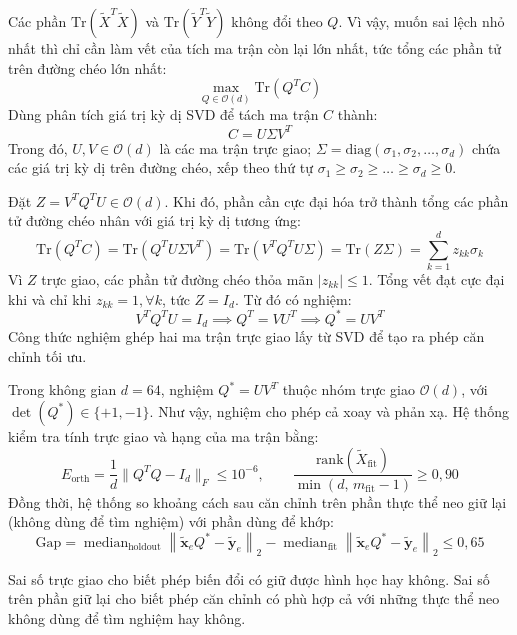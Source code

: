 Các phần $\text{Tr}(\widetilde{X}^T \widetilde{X})$ và $\text{Tr}(\widetilde{Y}^T \widetilde{Y})$ không đổi theo $Q$. Vì vậy, muốn sai lệch nhỏ nhất thì chỉ cần làm vết của tích ma trận còn lại lớn nhất, tức tổng các phần tử trên đường chéo lớn nhất:
\begin{equation}
\max_{Q \in \mathcal{O}(d)} \text{Tr}\left( Q^T C \right)
\end{equation}
Dùng phân tích giá trị kỳ dị SVD để tách ma trận $C$ thành:
\begin{equation}
C = U \Sigma V^T
\end{equation}
Trong đó, $U, V \in \mathcal{O}(d)$ là các ma trận trực giao; $\Sigma = \text{diag}(\sigma_1, \sigma_2, \dots, \sigma_d)$ chứa các giá trị kỳ dị trên đường chéo, xếp theo thứ tự $\sigma_1 \ge \sigma_2 \ge \dots \ge \sigma_d \ge 0$.

Đặt $Z = V^T Q^T U \in \mathcal{O}(d)$. Khi đó, phần cần cực đại hóa trở thành tổng các phần tử đường chéo nhân với giá trị kỳ dị tương ứng:
\begin{equation}
\text{Tr}\left( Q^T C \right) = \text{Tr}\left( Q^T U \Sigma V^T \right) = \text{Tr}\left( V^T Q^T U \Sigma \right) = \text{Tr}\left( Z \Sigma \right) = \sum_{k=1}^d z_{kk} \sigma_k
\end{equation}
Vì $Z$ trực giao, các phần tử đường chéo thỏa mãn $|z_{kk}| \le 1$. Tổng vết đạt cực đại khi và chỉ khi $z_{kk} = 1, \forall k$, tức $Z = I_d$. Từ đó có nghiệm:
\begin{equation}
V^T Q^T U = I_d \implies Q^T = V U^T \implies Q^* = U V^T
\label{eq:procrustes_solution}
\end{equation}
Công thức nghiệm ghép hai ma trận trực giao lấy từ SVD để tạo ra phép căn chỉnh tối ưu.
\begin{remark}
Trong không gian $d = 64$, nghiệm $Q^* = U V^T$ thuộc nhóm trực giao $\mathcal{O}(d)$, với $\det(Q^*) \in \{+1, -1\}$. Như vậy, nghiệm cho phép cả xoay và phản xạ. Hệ thống kiểm tra tính trực giao và hạng của ma trận bằng:
\begin{equation}
E_{\text{orth}} = \frac{1}{d} \| Q^T Q - I_d \|_F \le 10^{-6}, \qquad \frac{\text{rank}(\widetilde{X}_{\text{fit}})}{\min(d,\, m_{\text{fit}} - 1)} \ge 0{,}90
\end{equation}
Đồng thời, hệ thống so khoảng cách sau căn chỉnh trên phần thực thể neo giữ lại (không dùng để tìm nghiệm) với phần dùng để khớp:
\begin{equation}
\text{Gap} = \operatorname{median}_{\text{holdout}} \left\| \tilde{\mathbf{x}}_e Q^* - \tilde{\mathbf{y}}_e \right\|_2 - \operatorname{median}_{\text{fit}} \left\| \tilde{\mathbf{x}}_e Q^* - \tilde{\mathbf{y}}_e \right\|_2 \le 0{,}65
\end{equation}
\end{remark}
Sai số trực giao cho biết phép biến đổi có giữ được hình học hay không. Sai số trên phần giữ lại cho biết phép căn chỉnh có phù hợp cả với những thực thể neo không dùng để tìm nghiệm hay không.
